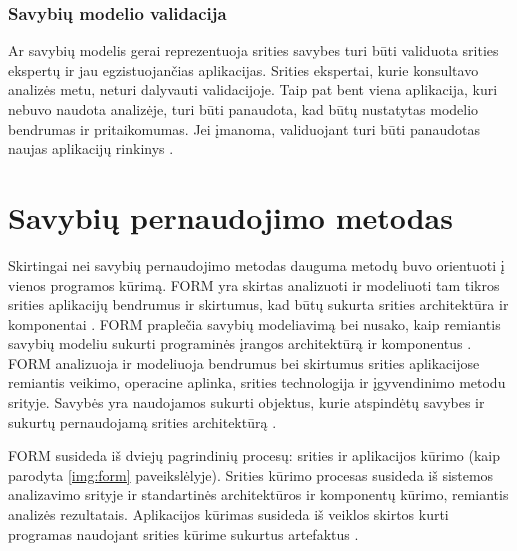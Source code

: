 \documentclass{VUMIFPSbakalaurinis}
\begin{document}
\subsubsection{Savybių modelio validacija} \label{validacija_teor}

Ar savybių modelis gerai reprezentuoja srities savybes turi būti validuota srities ekspertų ir jau egzistuojančias aplikacijas. Srities ekspertai, kurie konsultavo analizės metu, neturi dalyvauti validacijoje. Taip pat bent viena aplikacija, kuri nebuvo naudota analizėje, turi būti panaudota, kad  būtų nustatytas modelio bendrumas ir pritaikomumas. Jei įmanoma, validuojant turi būti panaudotas naujas aplikacijų rinkinys \cite{Kang1990}.




\section{Savybių pernaudojimo metodas} \label{form}

Skirtingai nei savybių pernaudojimo metodas dauguma metodų buvo orientuoti į vienos programos kūrimą. FORM yra skirtas analizuoti ir modeliuoti tam tikros srities aplikacijų bendrumus ir skirtumus, kad būtų sukurta srities architektūra ir komponentai \cite{Kang1999}. FORM praplečia savybių modeliavimą bei nusako, kaip remiantis savybių modeliu sukurti programinės įrangos architektūrą ir komponentus \cite{Kang}. FORM analizuoja ir modeliuoja bendrumus bei skirtumus srities aplikacijose remiantis veikimo, operacine aplinka, srities technologija ir įgyvendinimo metodu srityje. Savybės yra naudojamos sukurti objektus, kurie atspindėtų savybes ir sukurtų pernaudojamą srities architektūrą \cite{Lee2000}.

FORM susideda iš dviejų pagrindinių procesų: srities ir aplikacijos kūrimo (kaip parodyta \ref{img:form} paveikslėlyje). Srities kūrimo procesas susideda iš sistemos analizavimo srityje ir standartinės architektūros ir komponentų kūrimo, remiantis analizės rezultatais. Aplikacijos kūrimas susideda iš veiklos skirtos kurti programas naudojant srities kūrime sukurtus artefaktus \cite{Kang}.

\end{document}
